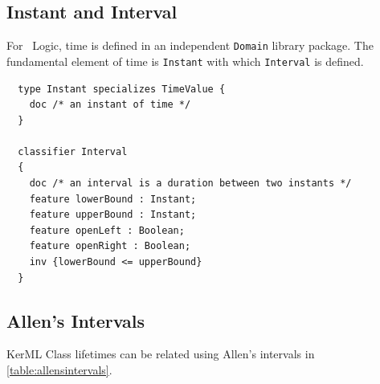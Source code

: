 \subsection{Instant and Interval}

For \logicid ~Logic, time is defined in an independent \texttt{Domain} library package.
The fundamental element of time is \texttt{Instant} with which \texttt{Interval} is defined.

\begin{lstlisting}
  type Instant specializes TimeValue {
    doc /* an instant of time */
  }

  classifier Interval
  {
    doc /* an interval is a duration between two instants */
    feature lowerBound : Instant;
    feature upperBound : Instant;
    feature openLeft : Boolean;
    feature openRight : Boolean; 
    inv {lowerBound <= upperBound}   
  }
\end{lstlisting}

\subsection{Allen's Intervals}\label{sec:allen}

\pn KerML Class lifetimes can be related using Allen's intervals in \ref{table:allensintervals}.  

